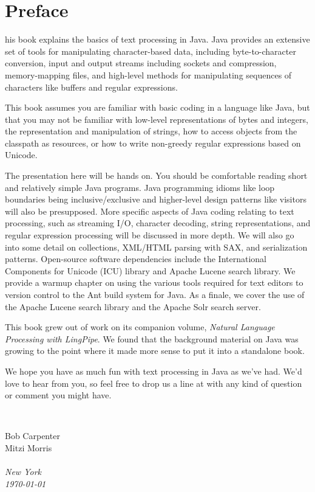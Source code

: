 \chapter*{Preface}
\pagestyle{fancy}%

his book explains the basics of text processing in Java.  
Java provides an extensive set of tools for manipulating
character-based data, including byte-to-character conversion, input
and output streams including sockets and compression, memory-mapping
files, and high-level methods for manipulating sequences of characters
like buffers and regular expressions.

This book assumes you are familiar with basic coding in a language like
Java, but that you may not be familiar with low-level representations
of bytes and integers, the representation and manipulation of
strings, how to access objects from the classpath as resources,
or how to write non-greedy regular expressions based on Unicode.

The presentation here will be hands on.  You should be comfortable
reading short and relatively simple Java programs.  Java programming
idioms like loop boundaries being inclusive/exclusive and higher-level
design patterns like visitors will also be presupposed.  More specific
aspects of Java coding relating to text processing, such as streaming
I/O, character decoding, string representations, and regular
expression processing will be discussed in more depth.  We will also
go into some detail on collections, XML/HTML parsing with SAX, and
serialization patterns.  Open-source software dependencies include the
International Components for Unicode (ICU) library and Apache Lucene
search library.  We provide a warmup chapter on using the various
tools required for text editors to version control to the Ant build
system for Java.  As a finale, we cover the use of the Apache Lucene
search library and the Apache Solr search server.

This book grew out of work on its companion volume, {\it Natural
Language Processing with LingPipe}.  We found that the background material
on Java was growing to the point where it made more sense to put it
into a standalone book.

We hope you have as much fun with text processing in Java as we've
had.  We'd love to hear from you, so feel free to drop us a line at
 with any kind of question or comment you
might have.

\vspace*{0.125in}

\newlength{\sigWidth}
\mbox{ }
\hfill
\parbox{\sigWidth}{
Bob Carpenter
\\[2pt]
Mitzi Morris
\\[2pt]
\\
\it New York
\\
\today}

